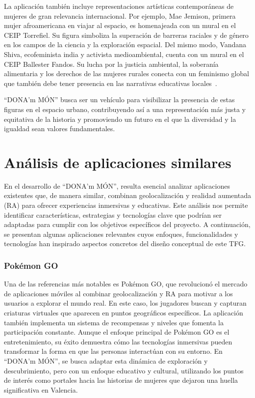 La aplicación también incluye representaciones artísticas contemporáneas de mujeres de gran relevancia internacional. Por ejemplo, Mae Jemison, primera mujer afroamericana en viajar al espacio, es homenajeada con un mural en el CEIP Torrefiel. Su figura simboliza la superación de barreras raciales y de género en los campos de la ciencia y la exploración espacial. Del mismo modo, Vandana Shiva, ecofeminista india y activista medioambiental, cuenta con un mural en el CEIP Ballester Fandos. Su lucha por la justicia ambiental, la soberanía alimentaria y los derechos de las mujeres rurales conecta con un feminismo global que también debe tener presencia en las narrativas educativas locales~\cite{shiva2005}.

“DONA’m MÓN” busca ser un vehículo para visibilizar la presencia de estas figuras en el espacio urbano, contribuyendo así a una representación más justa y equitativa de la historia y promoviendo un futuro en el que la diversidad y la igualdad sean valores fundamentales.





\section{Análisis de aplicaciones similares}

En el desarrollo de “DONA’m MÓN”, resulta esencial analizar aplicaciones existentes que, de manera similar, combinan geolocalización y realidad aumentada (RA) para ofrecer experiencias inmersivas y educativas. Este análisis nos permite identificar características, estrategias y tecnologías clave que podrían ser adaptadas para cumplir con los objetivos específicos del proyecto. A continuación, se presentan algunas aplicaciones relevantes cuyos enfoques, funcionalidades y tecnologías han inspirado aspectos concretos del diseño conceptual de este TFG.

\subsubsection{Pokémon GO}

Una de las referencias más notables es Pokémon GO, que revolucionó el mercado de aplicaciones móviles al combinar geolocalización y RA para motivar a los usuarios a explorar el mundo real. En este caso, los jugadores buscan y capturan criaturas virtuales que aparecen en puntos geográficos específicos. La aplicación también implementa un sistema de recompensas y niveles que fomenta la participación constante. Aunque el enfoque principal de Pokémon GO es el entretenimiento, su éxito demuestra cómo las tecnologías inmersivas pueden transformar la forma en que las personas interactúan con su entorno. En “DONA’m MÓN”, se busca adaptar esta dinámica de exploración y descubrimiento, pero con un enfoque educativo y cultural, utilizando los puntos de interés como portales hacia las historias de mujeres que dejaron una huella significativa en Valencia.

